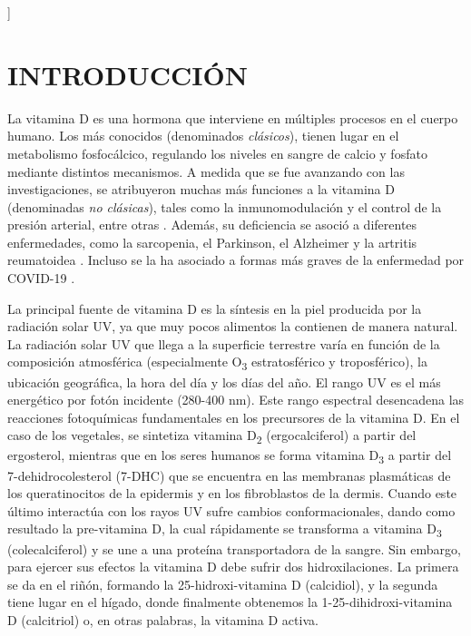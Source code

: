 \documentclass[10pt,twocolumn]{article}
\newcommand\cauthemail[1]{\footnotetext{#1}}
\begin{document}
\begin{@twocolumnfalse}
\begin{abstract}
\begin{minipage}{\dimexpr\paperwidth-6cm}
      \end{minipage}
      \vspace{4ex}
    \end{abstract}
  \end{@twocolumnfalse}
]
\thispagestyle{empty}

\setcounter{footnote}{1}
\cauthemail{ipina@ifir-conicet.gov.ar}  %
\section{INTRODUCCIÓN}
La vitamina D es una hormona que interviene en múltiples procesos en el cuerpo humano. Los más conocidos (denominados \emph{clásicos}), tienen lugar en el metabolismo fosfocálcico, regulando los niveles en sangre de calcio y fosfato mediante distintos mecanismos. A medida que se fue avanzando con las investigaciones, se atribuyeron muchas más funciones a la vitamina D (denominadas \emph{no clásicas}), tales como la inmunomodulación y el control de la presión arterial, entre otras \cite{bikle_2014,zuluga_2011,pozzo_2005}. Además, su deficiencia se asoció a diferentes enfermedades, como la sarcopenia, el Parkinson, el Alzheimer y la artritis reumatoidea \cite{pozzo_2005,Afzal_2013,Kravietz_2017,Ishikawa_2016}. Incluso se la ha asociado a formas más graves de la enfermedad por COVID-19 \cite{Mercola2020}.

La principal fuente de vitamina D es la síntesis en la piel producida por la radiación solar UV, ya que muy pocos alimentos la contienen de manera natural\cite{Biesalski_2002}. La radiación solar UV que llega a la superficie terrestre varía en función de la composición atmosférica (especialmente O\textsubscript{3} estratosférico y troposférico), la ubicación geográfica, la hora del día y los días del año. El rango UV es el más energético por fotón incidente (280-400 nm). Este rango espectral desencadena las reacciones fotoquímicas fundamentales en los precursores de la vitamina D. En el caso de los vegetales, se sintetiza vitamina D\textsubscript{2} (ergocalciferol) a partir del ergosterol, mientras que en los seres humanos se forma vitamina D\textsubscript{3} a partir del 7-dehidrocolesterol (7-DHC) que se encuentra en las membranas plasmáticas de los queratinocitos de la epidermis y en los fibroblastos de la dermis.\cite{2002,brunser_radiacion_2005,Olds2008} \cite{Zhang2010} Cuando este último interactúa con los rayos UV sufre cambios conformacionales, dando como resultado la pre-vitamina D, la cual rápidamente se transforma a vitamina D\textsubscript{3} (colecalciferol) y se une a una proteína transportadora de la sangre. Sin embargo, para ejercer sus efectos la vitamina D debe sufrir dos hidroxilaciones. La primera se da en el riñón, formando la 25-hidroxi-vitamina D (calcidiol), y la segunda tiene lugar en el hígado, donde finalmente obtenemos la 1-25-dihidroxi-vitamina D (calcitriol) o, en otras palabras, la vitamina D activa.\cite{Holick_1989}
\end{document}
